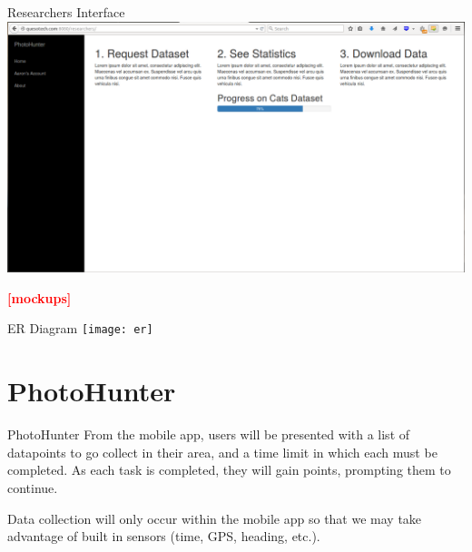 \documentclass[aspectratio=169]{beamer}
\newcommand{\todo}[1]{\textcolor{red}{\textbf{[#1]}}}
\begin{document}
\begin{frame}{Researchers Interface}
  \centering
  \includegraphics[width=\textwidth,height=\textheight,keepaspectratio]{researchers}
\end{frame}

\begin{frame}
  \todo{mockups}
\end{frame}

\begin{frame}{ER Diagram}
  \centering
  \texttt{[image: er]}
\end{frame}

\section{PhotoHunter}

\begin{frame}{PhotoHunter}
  From the mobile app, users will be presented with a list of
  datapoints
  to go collect in their area, and a time limit in which each must be
  completed. As each task is completed, they will gain points,
  prompting
  them to continue.

  Data collection will only occur within the mobile app so that we may
  take advantage of built in sensors (time, GPS, heading, etc.).
\end{frame}
\end{document}
